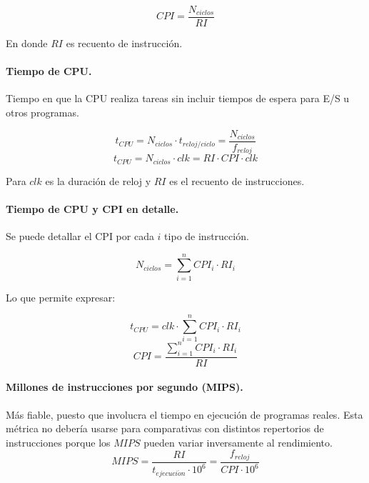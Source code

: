 \documentclass{article}
\begin{document}
\begin{multicols}{2}
		\begin{displaymath}
			CPI = \frac {N_{ciclos}} {RI}
		\end{displaymath}
		
		En donde $RI$ es recuento de instrucción.
		
		\paragraph{Tiempo de CPU.}
		Tiempo en que la CPU realiza tareas sin incluir tiempos de espera para
		E/S u otros programas.
		
		\begin{displaymath}
			t_{CPU} = N_{ciclos} \cdot t_{reloj/ciclo} = \frac {N_{ciclos}} {f_{reloj}}
		\end{displaymath}
		\begin{displaymath}
			t_{CPU} =  N_{ciclos} \cdot clk = RI \cdot CPI \cdot clk
		\end{displaymath}
		
		Para $clk$ es la duración de reloj y $RI$ es el recuento de instrucciones.
		
		\paragraph{Tiempo de CPU y CPI en detalle.}
		Se puede detallar el CPI por cada $i$ tipo de instrucción.
		
		\begin{displaymath}
			N_{ciclos} = \sum_{i=1}^{n} {CPI_i \cdot RI_i}
		\end{displaymath}
		
		Lo que permite expresar:
		
		\begin{displaymath}
			t_{CPU} = clk \cdot \sum_{i=1}^{n} {CPI_i \cdot RI_i}
		\end{displaymath}
		\begin{displaymath}
			CPI = \frac {\sum_{i=1}^{n} {CPI_i \cdot RI_i}} {RI}
		\end{displaymath}
		
		\paragraph{Millones de instrucciones por segundo (MIPS).}
		Más fiable, puesto que involucra el tiempo en ejecución de programas reales. Esta métrica no debería usarse para comparativas con distintos repertorios de instrucciones porque los $MIPS$ pueden variar inversamente al rendimiento.
		\begin{displaymath}
			MIPS = \frac {RI} {t_{ejecuci\acute{o}n} \cdot 10^6} = \frac {f_{reloj}} {CPI \cdot 10^6}
		\end{displaymath}
		

\end{multicols}
\end{document}
